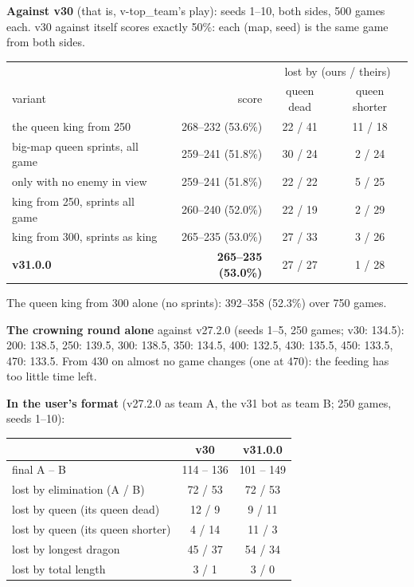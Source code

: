 \documentclass[11pt,a4paper]{article}
\begin{document}
\textbf{Against v30} (that is, v-top\_team's play): seeds 1--10, both sides, 500 games each. v30 against itself scores
exactly 50\%: each (map, seed) is the same game from both sides.
\begin{center}
\small
\begin{tabular}{>{\raggedright\arraybackslash}p{5.2cm}rcc}
  & & \multicolumn{2}{c}{lost by (ours / theirs)} \\
  variant & score & queen dead & queen shorter \\ \hline
  the queen king from 250 & 268--232 (53.6\%) & 22 / 41 & 11 / 18 \\
  big-map queen sprints, all game & 259--241 (51.8\%) & 30 / 24 & 2 / 24 \\
  \quad only with no enemy in view & 259--241 (51.8\%) & 22 / 22 & 5 / 25 \\
  king from 250, sprints all game & 260--240 (52.0\%) & 22 / 19 & 2 / 29 \\
  king from 300, sprints as king & 265--235 (53.0\%) & 27 / 33 & 3 / 26 \\
  \textbf{v31.0.0} & \textbf{265--235 (53.0\%)} & 27 / 27 & 1 / 28 \\
\end{tabular}
\normalsize
\end{center}
The queen king from 300 alone (no sprints): 392--358 (52.3\%) over 750 games.

\textbf{The crowning round alone} against v27.2.0 (seeds 1--5, 250 games; v30: 134.5): 200: 138.5, 250: 139.5, 300: 138.5,
350: 134.5, 400: 132.5, 430: 135.5, 450: 133.5, 470: 133.5. From 430 on almost no game changes (one at 470): the feeding
has too little time left.

\textbf{In the user's format} (v27.2.0 as team A, the v31 bot as team B; 250 games, seeds 1--10):
\begin{center}
\begin{tabular}{lcc}
  & v30 & v31.0.0 \\ \hline
  final A -- B & 114 -- 136 & 101 -- 149 \\
  lost by elimination (A / B) & 72 / 53 & 72 / 53 \\
  lost by queen (its queen dead) & 12 / 9 & 9 / 11 \\
  lost by queen (its queen shorter) & 4 / 14 & 11 / 3 \\
  lost by longest dragon & 45 / 37 & 54 / 34 \\
  lost by total length & 3 / 1 & 3 / 0 \\
\end{tabular}
\end{center}
\end{document}
